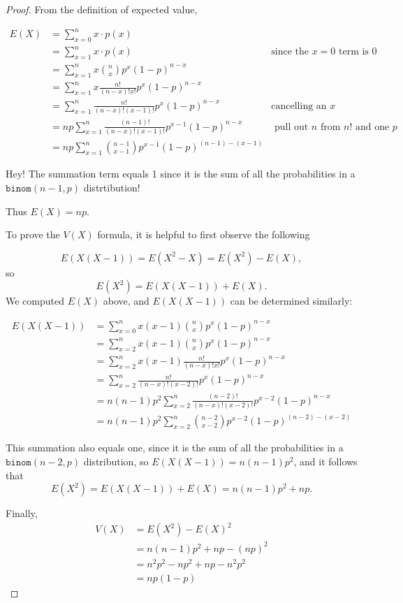 \documentclass[
]{book}
\theoremstyle{definition}
\theoremstyle{definition}
\theoremstyle{definition}
\theoremstyle{definition}
\theoremstyle{remark}
\begin{document}
\begin{proof}
From the definition of expected value,

\begin{align*}
E(X) &= \sum_{x=0}^n x \cdot p(x) \\
     &= \sum_{x=1}^n x \cdot p(x) & \text{since the } x = 0 \text{ term is  } 0 \\
     &= \sum_{x=1}^n x \binom{n}{x} p^x (1-p)^{n-x} \\
     &= \sum_{x=1}^n x \frac{n!}{(n-x)!x!} p^x (1-p)^{n-x} \\
     &= \sum_{x=1}^n \frac{n!}{(n-x)!(x-1)!} p^x (1-p)^{n-x} &\text{cancelling an } x\\
     &= np \sum_{x=1}^n \frac{(n-1)!}{(n-x)!(x-1)!}p^{x-1}(1-p)^{n-x} &\text{ pull out }n\text{ from }n!\text{ and one }p\\
     &= np \sum_{x=1}^n \binom{n-1}{x-1}p^{x-1}(1-p)^{(n-1)-(x-1)}
\end{align*}

Hey! The summation term equals 1 since it is the sum of all the probabilities in a \(\texttt{binom}(n-1,p)\) distrtibution!

Thus \(E(X) = np\).

To prove the \(V(X)\) formula, it is helpful to first observe the following

\[E(X(X-1)) = E(X^2-X) = E(X^2)-E(X),\] so
\[E(X^2) = E(X(X-1))+E(X).\]
We computed \(E(X)\) above, and \(E(X(X-1))\) can be determined similarly:

\begin{align*}
E(X(X-1)) &= \sum_{x=0}^n x(x-1)\binom{n}{x}p^x(1-p)^{n-x} \\
          &= \sum_{x=2}^n x(x-1)\binom{n}{x}p^x(1-p)^{n-x} \\
          &= \sum_{x=2}^n x(x-1)\frac{n!}{(n-x)!x!}p^x(1-p)^{n-x} \\
          &= \sum_{x=2}^n \frac{n!}{(n-x)!(x-2)!}p^x(1-p)^{n-x} \\
          &= n(n-1)p^2 \sum_{x=2}^n \frac{(n-2)!}{(n-x)!(x-2)!}p^{x-2}(1-p)^{n-x} \\
          &= n(n-1)p^2 \sum_{x=2}^n\binom{n-2}{x-2}p^{x-2}(1-p)^{(n-2)-(x-2)}
\end{align*}

This summation also equals one, since it is the sum of all the probabilities in a \(\texttt{binom}(n-2,p)\) distribution, so \(E(X(X-1)) = n(n-1)p^2\), and it follows that
\[E(X^2) = E(X(X-1))+E(X) = n(n-1)p^2 + np.\]

Finally,
\begin{align*} 
V(X) &= E(X^2) - E(X)^2 \\
     &= n(n-1)p^2 + np - (np)^2 \\
     &= n^2p^2 - np^2 + np - n^2p^2 \\
     &= np(1-p)
\end{align*}
\end{proof}
\end{document}

